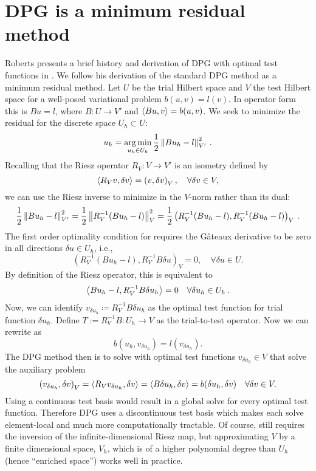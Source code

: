 \documentclass{report}
\begin{document}
\section{DPG is a minimum residual method}
Roberts \etal presents a brief history and derivation of DPG with optimal test functions in
\cite{DPGStokes}. We follow his derivation of the standard DPG method as a
minimum residual method. Let $U$ be the trial Hilbert space and $V$ the test
Hilbert space for a well-posed variational problem $b(u,v)=l(v)$. In operator
form this is $Bu=l$, where $B:U\rightarrow V'$ and $\left\langle Bu,v \right\rangle=b(u,v)$. We seek to minimize the
residual for the discrete space $U_h\subset U$:
\begin{equation}
u_h=\operatorname*{arg\,min}_{u_h\in U_h}\frac{1}{2}\left\| Bu_h-l \right\|^2_{V'}\,.
\label{minresidual}
\end{equation}
Recalling that the Riesz operator $R_V:V\rightarrow V'$ is an isometry defined
by
\[
\left\langle R_Vv,\delta v \right\rangle=\left( v,\delta v \right)_V,\quad\forall\delta v\in V,
\]
we can use the Riesz inverse to minimize in the $V$-norm rather than its dual:
\begin{equation}
\frac{1}{2}\left\| Bu_h-l \right\|^2_{V'}=\frac{1}{2}\left\| R_V^{-1}(Bu_h-l) \right\|^2_V
=\frac{1}{2}\left( R_V^{-1}(Bu_h-l),R_V^{-1}(Bu_h-l) \right)_V\,.
\label{eq:rieszapplied}
\end{equation}
The first order optimality condition for  requires
the G\^ateaux derivative to be zero in all directions $\delta u \in
U_h$, i.e.,
\[
\left(R_V^{-1}(Bu_h-l),R_V^{-1}B\delta u\right)_V = 0, \quad \forall \delta u \in U.
\]
By definition of the Riesz operator, this is equivalent to
\begin{equation}
\left\langle Bu_h-l,R_V^{-1}B\delta u_h \right\rangle=0\quad\forall\delta u_h\in U_h\,.
\label{eq:DPGbilinearform}
\end{equation}
Now, we can identify $v_{\delta u_h}\coloneqq R_V^{-1}B\delta u_h$ as the
optimal test function for trial function $\delta u_h$. Define $T:=R_V^{-1}B:U_h\rightarrow V$ as the trial-to-test operator. Now we can rewrite
 as
\begin{equation}
b(u_h,v_{\delta u_h})=l(v_{\delta u_h}).
\label{eq:DPGmethod}
\end{equation}
The DPG method then is to solve  with optimal test functions
$v_{\delta u_h}\in V$ that solve the auxiliary problem
\begin{equation}
\left( v_{\delta u_h},\delta v \right)_V=\left\langle R_Vv_{\delta u_h},\delta v \right\rangle
=\left\langle B\delta u_h,\delta v \right\rangle=b(\delta u_h,\delta v)\quad\forall\delta v\in V.
\label{eq:optimaltestproblem}
\end{equation}
Using a continuous test basis would result in a global solve for every optimal
test function. Therefore DPG uses a discontinuous test basis which makes each
solve element-local and much more computationally tractable. Of course,
 still requires the inversion of the
infinite-dimensional Riesz map, but approximating $V$ by a finite
dimensional space, $V_h$, which is of a higher polynomial degree than $U_h$ (hence
``enriched space'') works well in practice.
\end{document}
